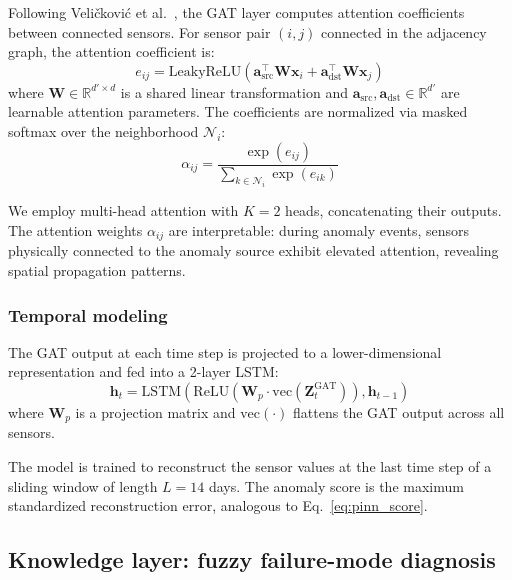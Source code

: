 \documentclass[preprint,12pt,review]{elsarticle}
\begin{document}
Following Veli\v{c}kovi\'c et al.~\cite{velickovic2018graph}, the GAT layer computes attention coefficients between connected sensors. For sensor pair $(i, j)$ connected in the adjacency graph, the attention coefficient is:
\begin{equation}
e_{ij} = \mathrm{LeakyReLU}\!\left(\mathbf{a}_{\mathrm{src}}^\top \mathbf{W} \mathbf{x}_i + \mathbf{a}_{\mathrm{dst}}^\top \mathbf{W} \mathbf{x}_j\right)
\label{eq:gat_attention}
\end{equation}
where $\mathbf{W} \in \mathbb{R}^{d' \times d}$ is a shared linear transformation and $\mathbf{a}_{\mathrm{src}}, \mathbf{a}_{\mathrm{dst}} \in \mathbb{R}^{d'}$ are learnable attention parameters. The coefficients are normalized via masked softmax over the neighborhood $\mathcal{N}_i$:
\begin{equation}
\alpha_{ij} = \frac{\exp(e_{ij})}{\sum_{k \in \mathcal{N}_i} \exp(e_{ik})}
\label{eq:gat_softmax}
\end{equation}

We employ multi-head attention with $K=2$ heads, concatenating their outputs. The attention weights $\alpha_{ij}$ are interpretable: during anomaly events, sensors physically connected to the anomaly source exhibit elevated attention, revealing spatial propagation patterns.

\subsubsection{Temporal modeling}

The GAT output at each time step is projected to a lower-dimensional representation and fed into a 2-layer LSTM:
\begin{equation}
\mathbf{h}_t = \mathrm{LSTM}\!\left(\mathrm{ReLU}(\mathbf{W}_p \cdot \mathrm{vec}(\mathbf{Z}_t^{\mathrm{GAT}})), \mathbf{h}_{t-1}\right)
\label{eq:lstm}
\end{equation}
where $\mathbf{W}_p$ is a projection matrix and $\mathrm{vec}(\cdot)$ flattens the GAT output across all sensors.

The model is trained to reconstruct the sensor values at the last time step of a sliding window of length $L = 14$ days. The anomaly score is the maximum standardized reconstruction error, analogous to Eq.~\eqref{eq:pinn_score}.

\subsection{Knowledge layer: fuzzy failure-mode diagnosis}
\label{sec:knowledge}
\end{document}
